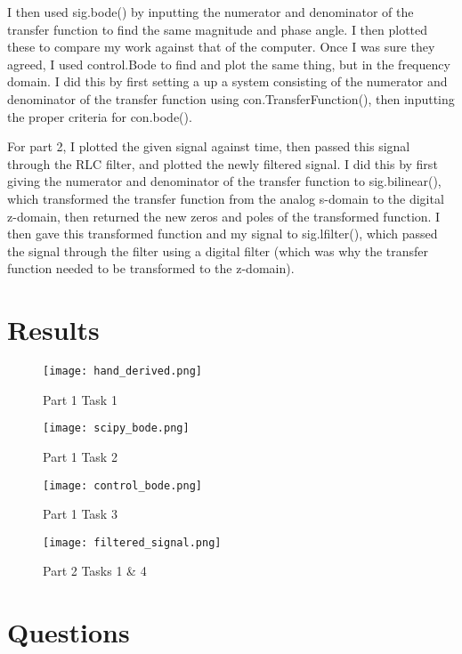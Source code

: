 \documentclass[12pt]{report}
\begin{document}
I then used sig.bode() by inputting the numerator and denominator of the transfer function to find the same magnitude and phase angle. I then plotted these to compare my work against that of the computer. Once I was sure they agreed, I used control.Bode to find and plot the same thing, but in the frequency domain. I did this by first setting a up a system consisting of the numerator and denominator of the transfer function using con.TransferFunction(), then inputting the proper criteria for con.bode(). 

For part 2, I plotted the given signal against time, then passed this signal through the RLC filter, and plotted the newly filtered signal. I did this by first giving the numerator and denominator of the transfer function to sig.bilinear(), which transformed the transfer function from the analog s-domain to the digital z-domain, then returned the new zeros and poles of the transformed function. I then gave this transformed function and my signal to sig.lfilter(), which passed the signal through the filter using a digital filter (which was why the transfer function needed to be transformed to the z-domain).

 \section{Results}
 
\begin{figure}[H]
    \centering
    \texttt{[image: hand\_derived.png]}
    \caption{Part 1 Task 1}
\end{figure}

\begin{figure}[H]
    \centering
    \texttt{[image: scipy\_bode.png]}
    \caption{Part 1 Task 2}
\end{figure}

\begin{figure}[H]
    \centering
    \texttt{[image: control\_bode.png]}
    \caption{Part 1 Task 3}
\end{figure}

\begin{figure}[H]
    \centering
    \texttt{[image: filtered\_signal.png]}
    \caption{Part 2 Tasks 1 & 4}
\end{figure}
 
 \section{Questions}
\end{document}
